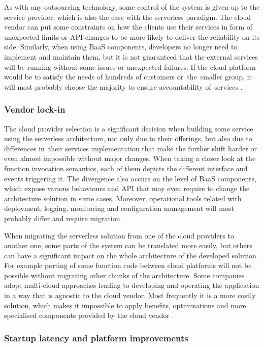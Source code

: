 As with any outsourcing technology, some control of the system is given up to the service provider, which is also the case with the serverless paradigm. The cloud vendor can put some constraints on how the clients use their services in form of unexpected limits or API changes to be more likely to deliver the reliability on its side. Similarly, when using BaaS components, developers no longer need to implement and maintain them, but it is not guaranteed that the external services will be running without some issues or unexpected failures. If the cloud platform would be to satisfy the needs of hundreds of customers or~the~smaller group, it will most probably choose the majority to ensure accountability of~services \cite{MartinFowlerServerless}.

\subsubsection{Vendor lock-in}

The cloud provider selection is a significant decision when building some service using the serverless architecture, not only due to their offerings, but also due to differences in~their services implementation that make the further shift harder or even almost impossible without major changes. When taking a closer look at the function invocation semantics, each of them depicts the different interface and events triggering it. The divergence also occurs on the level of BaaS components, which expose various behaviours and API that may even require to change the architecture solution in some cases. Moreover, operational tools related with deployment, logging, monitoring and configuration management will most probably differ and require migration.

When migrating the serverless solution from one of the cloud providers to another one, some parts of the system can be translated more easily, but others can have a significant impact on the whole architecture of the developed solution. For example porting of some function code between cloud platforms will not be possible without migrating other chunks of the architecture. Some companies adopt multi-cloud approaches leading to developing and operating the application in a way that is agnostic to the cloud vendor. Most frequently it is a more costly solution, which makes it impossible to apply benefits, optimisations and more specialised components provided by the cloud vendor \cite{MartinFowlerServerless}.

\subsubsection{Startup latency and platform improvements} \label{chapter:serverless-startup-latency-and-platform-improvements}

